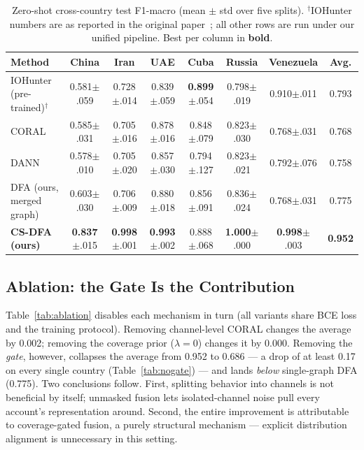 \documentclass[conference]{IEEEtran}
\newcommand{\method}{CS-DFA}
\begin{document}
\begin{table}[t]
\centering
\caption{Zero-shot cross-country test F1-macro (mean $\pm$ std over five
splits). $^\dagger$IOHunter numbers are as reported in the original
paper~\cite{minici2025iohunter}; all other rows are run under our unified
pipeline. Best per column in \textbf{bold}.}
\label{tab:main}
\begin{tabular}{lccccccc}
\toprule
Method & China & Iran & UAE & Cuba & Russia & Venezuela & Avg. \\
\midrule
IOHunter (pre-trained)$^\dagger$~\cite{minici2025iohunter}
  & 0.581{\scriptsize$\pm$.059} & 0.728{\scriptsize$\pm$.014}
  & 0.839{\scriptsize$\pm$.059} & \textbf{0.899}{\scriptsize$\pm$.054}
  & 0.798{\scriptsize$\pm$.019} & 0.910{\scriptsize$\pm$.011} & 0.793 \\
CORAL~\cite{sun2016coral}
  & 0.585{\scriptsize$\pm$.031} & 0.705{\scriptsize$\pm$.016}
  & 0.878{\scriptsize$\pm$.016} & 0.848{\scriptsize$\pm$.079}
  & 0.823{\scriptsize$\pm$.030} & 0.768{\scriptsize$\pm$.031} & 0.768 \\
DANN~\cite{ganin2016dann}
  & 0.578{\scriptsize$\pm$.010} & 0.705{\scriptsize$\pm$.020}
  & 0.857{\scriptsize$\pm$.030} & 0.794{\scriptsize$\pm$.127}
  & 0.823{\scriptsize$\pm$.021} & 0.792{\scriptsize$\pm$.076} & 0.758 \\
DFA (ours, merged graph)
  & 0.603{\scriptsize$\pm$.030} & 0.706{\scriptsize$\pm$.009}
  & 0.880{\scriptsize$\pm$.018} & 0.856{\scriptsize$\pm$.091}
  & 0.836{\scriptsize$\pm$.024} & 0.768{\scriptsize$\pm$.031} & 0.775 \\
\textbf{\method{} (ours)}
  & \textbf{0.837}{\scriptsize$\pm$.015} & \textbf{0.998}{\scriptsize$\pm$.001}
  & \textbf{0.993}{\scriptsize$\pm$.002} & 0.888{\scriptsize$\pm$.068}
  & \textbf{1.000}{\scriptsize$\pm$.000} & \textbf{0.998}{\scriptsize$\pm$.003}
  & \textbf{0.952} \\
\bottomrule
\end{tabular}
\end{table}

\subsection{Ablation: the Gate Is the Contribution}
\label{sec:ablation}
Table~\ref{tab:ablation} disables each mechanism in turn (all variants share
BCE loss and the training protocol). Removing channel-level CORAL changes
the average by 0.002; removing the coverage prior ($\lambda{=}0$) changes it
by 0.000. Removing the \emph{gate}, however, collapses the average from
0.952 to 0.686 --- a drop of at least 0.17 on every single country
(Table~\ref{tab:nogate}) --- and lands \emph{below} single-graph DFA
(0.775). Two conclusions follow. First, splitting behavior into channels is
not beneficial by itself; unmasked fusion lets isolated-channel noise pull
every account's representation around. Second, the entire improvement is
attributable to coverage-gated fusion, a purely structural mechanism ---
explicit distribution alignment is unnecessary in this setting.
\end{document}
